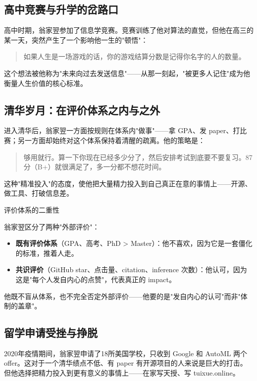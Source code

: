 \documentclass[a4paper]{article}
\begin{document}
\subsection{高中竞赛与升学的岔路口}

高中时期，翁家翌参加了信息学竞赛。竞赛训练了他对算法的直觉，但他在高三的某一天，突然产生了一个影响他一生的"顿悟"：

\begin{quote}
如果人生是一场游戏的话，你的游戏结算分数是记得你名字的人的数量。
\end{quote}

这个想法被他称为"未来向过去发送信息"——从那一刻起，"被更多人记住"成为他衡量人生价值的核心标准。

\subsection{清华岁月：在评价体系之内与之外}

进入清华后，翁家翌一方面按规则在体系内"做事"——拿 GPA、发 paper、打比赛；另一方面却始终对这个体系保持着清醒的疏离。他的策略是：

\begin{quote}
够用就行。算一下你现在已经多少分了，然后安排考试到底要不要复习。87分（B+）就很满足了，多一分都不想花时间。
\end{quote}

这种"精准投入"的态度，使他把大量精力投入到自己真正在意的事情上——开源、做工具、打破信息差。

\begin{knowledgebox}{评价体系的二重性}

翁家翌区分了两种"外部评价"：
\begin{itemize}
\item \textbf{既有评价体系}（GPA、高考、PhD > Master）：他不喜欢，因为它是一套僵化的标准，推着人走。
\item \textbf{共识评价}（GitHub star、点击量、citation、inference 次数）：他认可，因为这是"每个人发自内心的点赞"，代表真正的 impact。
\end{itemize}
他既不盲从体系，也不完全否定外部评价——他要的是"发自内心的认可"而非"体制的盖章"。
\end{knowledgebox}


\subsection{留学申请受挫与挣脱}

2020年疫情期间，翁家翌申请了18所美国学校，只收到 Google 和 AutoML 两个 offer。这对于一个清华绩点不低、有 paper 有开源项目的人来说是巨大的打击。但他选择把精力投入到更有意义的事情上——在家写天授、写 tuixue.online。
\end{document}
